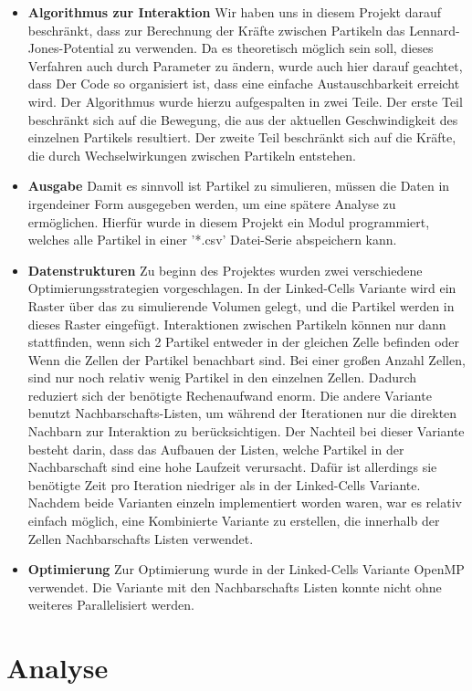 \documentclass[
	12pt,
	a4paper,
	BCOR10mm,
	DIV14,
	headsepline,
]{scrreprt}
\begin{document}
\begin{itemize}
	\item \textbf{Algorithmus zur Interaktion} Wir haben uns in diesem Projekt darauf beschränkt, dass zur Berechnung der Kräfte zwischen Partikeln das Lennard-Jones-Potential zu verwenden. Da es theoretisch möglich sein soll, dieses Verfahren auch durch Parameter zu ändern, wurde auch hier darauf geachtet, dass Der Code so organisiert ist, dass eine einfache Austauschbarkeit erreicht wird. Der Algorithmus wurde hierzu aufgespalten in zwei Teile. Der erste Teil beschränkt sich auf die Bewegung, die aus der aktuellen Geschwindigkeit des einzelnen Partikels resultiert. Der zweite Teil beschränkt sich auf die Kräfte, die durch Wechselwirkungen zwischen Partikeln entstehen.
	\item \textbf{Ausgabe} Damit es sinnvoll ist Partikel zu simulieren, müssen die Daten in irgendeiner Form ausgegeben werden, um eine spätere Analyse zu ermöglichen. Hierfür wurde in diesem Projekt ein Modul programmiert, welches alle Partikel in einer '*.csv' Datei-Serie abspeichern kann. 
	\item \textbf{Datenstrukturen} Zu beginn des Projektes wurden zwei verschiedene Optimierungsstrategien vorgeschlagen. In der Linked-Cells Variante wird ein Raster über das zu simulierende Volumen gelegt, und die Partikel werden in dieses Raster eingefügt. Interaktionen zwischen Partikeln können nur dann stattfinden, wenn sich 2 Partikel entweder in der gleichen Zelle befinden oder Wenn die Zellen der Partikel benachbart sind. Bei einer großen Anzahl Zellen, sind nur noch relativ wenig Partikel in den einzelnen Zellen. Dadurch reduziert sich der benötigte Rechenaufwand enorm. Die andere Variante benutzt Nachbarschafts-Listen, um während der Iterationen nur die direkten Nachbarn zur Interaktion zu berücksichtigen. Der Nachteil bei dieser Variante besteht darin, dass das Aufbauen der Listen, welche Partikel in der Nachbarschaft sind eine hohe Laufzeit verursacht. Dafür ist allerdings sie benötigte Zeit pro Iteration niedriger als in der Linked-Cells Variante. Nachdem beide Varianten einzeln implementiert worden waren, war es relativ einfach möglich, eine Kombinierte Variante zu erstellen, die innerhalb der Zellen Nachbarschafts Listen verwendet.
	\item \textbf{Optimierung} Zur Optimierung wurde in der Linked-Cells Variante OpenMP verwendet. Die Variante mit den Nachbarschafts Listen konnte nicht ohne weiteres Parallelisiert werden.
\end{itemize}


\section{Analyse}
\end{document}
